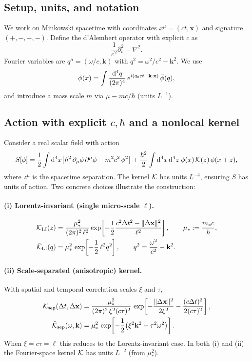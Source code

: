 \subsection{Setup, units, and notation}
We work on Minkowski spacetime with coordinates \(x^\mu=(ct,\mathbf{x})\) and signature \((+,-,-,-)\).
Define the d'Alembert operator with explicit \(c\) as
\begin{equation}
\frac{1}{c^{2}}\partial_t^2-\nabla^2.
\end{equation}
Fourier variables are \(q^\mu=(\omega/c,\mathbf{k})\) with \(q^2=\omega^2/c^2-\mathbf{k}^2\). We use
\begin{equation}
\phi(x)=\int \frac{\mathrm{d}^4 q}{(2\pi)^4}\,e^{i(q_0 ct-\mathbf{k}\cdot\mathbf{x})}\,\tilde{\phi}(q),
\end{equation}
and introduce a mass scale \(m\) via \(\mu\equiv mc/\hbar\) (units \(L^{-1}\)).

\subsection{Action with explicit \(c,\hbar\) and a nonlocal kernel}
Consider a real scalar field with action
\begin{equation}\label{eq:action_book_main}
S[\phi]=\frac{1}{2}\int \mathrm{d}^4 x\!\left[\hbar^2\,\partial_\mu\phi\,\partial^\mu\phi-m^2c^2\,\phi^2\right]
+\frac{\hbar^2}{2}\int \mathrm{d}^4x\,\mathrm{d}^4 z\;\phi(x)\,\mathcal{K}(z)\,\phi(x+z),
\end{equation}
where \(z^\mu\) is the spacetime separation. The kernel \(\mathcal{K}\) has units \(L^{-4}\), ensuring \(S\) has units of action. Two concrete choices illustrate the construction:

\paragraph{(i) Lorentz-invariant (single micro-scale \(\ell\)).}
\begin{align}
\mathcal{K}_{\mathrm{LI}}(z)&=\frac{\mu_*^2}{(2\pi)^2\,\ell^2}\exp\!\left[-\frac{1}{2}\frac{c^2\Delta t^2-\|\Delta\mathbf{x}\|^{2}}{\ell^2}\right],\qquad
\mu_*:=\frac{m_*c}{\hbar},\\
\tilde{\mathcal{K}}_{\mathrm{LI}}(q)&=\mu_*^2\,\exp\!\left[-\frac{1}{2}\,\ell^2 q^2\right],\qquad q^2=\frac{\omega^2}{c^2}-\mathbf{k}^2.
\end{align}

\paragraph{(ii) Scale-separated (anisotropic) kernel.}
With spatial and temporal correlation scales \(\xi\) and \(\tau\),
\begin{align}
\mathcal{K}_{\mathrm{sep}}(\Delta t,\Delta\mathbf{x})
&=\frac{\mu_*^2}{(2\pi)^2\,\xi^2(c\tau)^2}\,
\exp\!\left[-\frac{\|\Delta\mathbf{x}\|^2}{2\xi^2}-\frac{(c\Delta t)^2}{2(c\tau)^2}\right],\\
\tilde{\mathcal{K}}_{\mathrm{sep}}(\omega,\mathbf{k})
&=\mu_*^2\,\exp\!\left[-\frac{1}{2}\big(\xi^2\mathbf{k}^2+\tau^2\omega^2\big)\right].
\end{align}
When \(\xi=c\tau=\ell\) this reduces to the Lorentz-invariant case. In both (i) and (ii) the Fourier-space kernel \(\tilde{\mathcal{K}}\) has units \(L^{-2}\) (from \(\mu_*^2\)).

